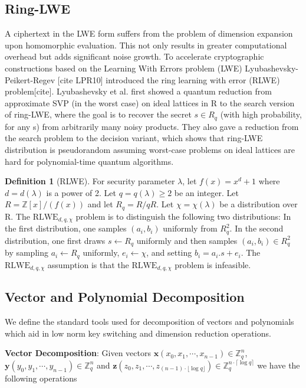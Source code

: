 \documentclass[10pt,journal,compsoc]{IEEEtran}
\theoremstyle{definition}
\newtheorem{definition}{Definition}[section]
\begin{document}
\subsection{Ring-LWE}
A ciphertext in the LWE form suffers from the problem of dimension expansion upon homomorphic evaluation. This not only results in greater computational overhead but adds significant noise growth. To accelerate cryptographic constructions based on the Learning With Errors problem (LWE) Lyubashevsky-Peikert-Regev [cite LPR10] introduced the ring learning with error (RLWE) problem[cite]. Lyubashevsky et al. first showed a quantum reduction from approximate SVP (in the worst case) on ideal lattices in R to the search version of ring-LWE, where the goal is to recover the secret $s \in R_q$ (with high probability, for any s) from arbitrarily many noisy products. They also gave a reduction from
the search problem to the decision variant, which shows that ring-LWE distribution is pseudorandom assuming worst-case problems on ideal lattices are hard for polynomial-time quantum algorithms.

\begin{definition}[RLWE]

For security parameter $\lambda$, let $f\left(x\right) = x^d +1$ where $d = d(\lambda)$ is a power of 2. Let $q = q(\lambda) \geq 2$ be an integer. Let $R = \mathbb{Z}[x]/\left(f(x)\right)$ and let $R_q = R/qR$. Let $\chi = \chi\left(\lambda\right)$ be a distribution over R.  The $\textrm{RLWE}_{d,q,\chi}$ problem is to distinguish the following two distributions: In the first distribution, one samples $\left( a_i , b_i\right)$ uniformly from $R_q^2$. In the second distribution, one first draws $s \leftarrow R_q$ uniformly and then samples $\left(a_i,b_i\right) \in R_q^2$ by sampling $a_i \leftarrow R_q$ uniformly, $e_i \leftarrow \chi$, and setting $b_i = a_i.s + e_i$. The $\textrm{RLWE}_{d,q,\chi}$ assumption is that the $\textrm{RLWE}_{d,q,\chi}$ problem is infeasible.

\end{definition}

\subsection{Vector and Polynomial Decomposition}

We define the standard tools used for decomposition of vectors and polynomials which aid in low norm key switching and dimension reduction operations. 

\textbf{Vector Decomposition}: Given vectors $\textbf{x}\left(x_0,x_1,\cdots,x_{n-1}\right) \in \mathbb{Z}_q^n$, $\textbf{y}\left(y_0,y_1,\cdots,y_{n-1}\right)\in \mathbb{Z}_q^n$ and $\textbf{z}\left(z_0,z_1,\cdots,z_{(n-1)\cdot\lfloor \log q \rfloor}\right)\in \mathbb{Z}_q^{n\cdot\lceil \log q \rceil}$ we have the following operations
\end{document}
